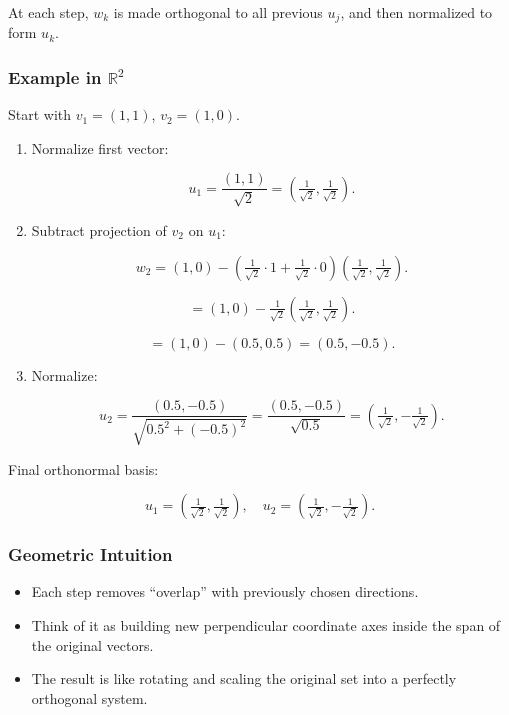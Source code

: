 \documentclass[
  letterpaper,
  DIV=11,
  numbers=noendperiod]{scrreprt}
\providecommand{\tightlist}{%
  \setlength{\itemsep}{0pt}\setlength{\parskip}{0pt}}
\begin{document}
At each step, \(w_k\) is made orthogonal to all previous \(u_j\), and
then normalized to form \(u_k\).

\subsubsection{\texorpdfstring{Example in
\(\mathbb{R}^2\)}{Example in \textbackslash mathbb\{R\}\^{}2}}\label{example-in-mathbbr2-3}

Start with \(v_1 = (1,1)\), \(v_2 = (1,0)\).

\begin{enumerate}
\def\labelenumi{\arabic{enumi}.}
\item
  Normalize first vector:

  \[
  u_1 = \frac{(1,1)}{\sqrt{2}} = \left(\tfrac{1}{\sqrt{2}}, \tfrac{1}{\sqrt{2}}\right).
  \]
\item
  Subtract projection of \(v_2\) on \(u_1\):

  \[
  w_2 = (1,0) - \left(\tfrac{1}{\sqrt{2}}\cdot1 + \tfrac{1}{\sqrt{2}}\cdot0\right)\left(\tfrac{1}{\sqrt{2}}, \tfrac{1}{\sqrt{2}}\right).
  \]

  \[
  = (1,0) - \tfrac{1}{\sqrt{2}}\left(\tfrac{1}{\sqrt{2}}, \tfrac{1}{\sqrt{2}}\right).
  \]

  \[
  = (1,0) - (0.5,0.5) = (0.5,-0.5).
  \]
\item
  Normalize:

  \[
  u_2 = \frac{(0.5,-0.5)}{\sqrt{0.5^2+(-0.5)^2}} = \frac{(0.5,-0.5)}{\sqrt{0.5}} = \left(\tfrac{1}{\sqrt{2}}, -\tfrac{1}{\sqrt{2}}\right).
  \]
\end{enumerate}

Final orthonormal basis:

\[
u_1 = \left(\tfrac{1}{\sqrt{2}}, \tfrac{1}{\sqrt{2}}\right), \quad u_2 = \left(\tfrac{1}{\sqrt{2}}, -\tfrac{1}{\sqrt{2}}\right).
\]

\subsubsection{Geometric Intuition}\label{geometric-intuition-5}

\begin{itemize}
\tightlist
\item
  Each step removes ``overlap'' with previously chosen directions.
\item
  Think of it as building new perpendicular coordinate axes inside the
  span of the original vectors.
\item
  The result is like rotating and scaling the original set into a
  perfectly orthogonal system.
\end{itemize}
\end{document}
